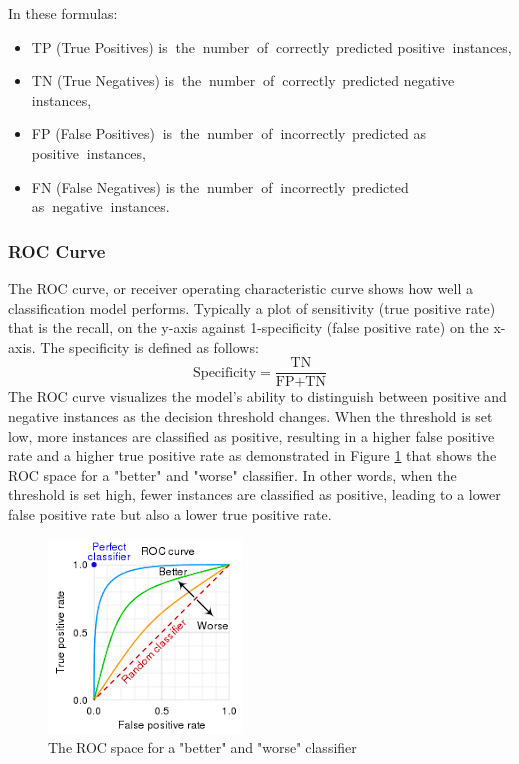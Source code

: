 In these formulas:
\begin{itemize}
    \item TP (True Positives) is\textcolor{white}{..}the\textcolor{white}{..}number\textcolor{white}{..}of\textcolor{white}{..}correctly\textcolor{white}{..}predicted positive\textcolor{white}{..}instances,
    \item TN (True Negatives) is\textcolor{white}{..}the\textcolor{white}{..}number\textcolor{white}{..}of\textcolor{white}{..}correctly\textcolor{white}{..}predicted negative instances,
    \item FP (False Positives)\textcolor{white}{..}is\textcolor{white}{..}the\textcolor{white}{..}number\textcolor{white}{..}of\textcolor{white}{..}incorrectly\textcolor{white}{..}predicted as positive\textcolor{white}{..}instances,
    \item FN (False Negatives) is the\textcolor{white}{..}number\textcolor{white}{..}of\textcolor{white}{..}incorrectly\textcolor{white}{..}predicted as\textcolor{white}{..}negative\textcolor{white}{..}instances.
\end{itemize}

\subsubsection{ROC Curve} 
The ROC curve, or receiver operating characteristic curve shows how well a classification model performs. Typically a plot of sensitivity (true positive rate) that is the recall, on the y-axis against 1-specificity (false positive rate) on the x-axis. The specificity is defined as follows:
 \begin{equation}
    \text{Specificity} = \frac{\text{TN}}{\text{FP} + \text{TN}}
    \end{equation}
The ROC curve visualizes the model's ability to distinguish between positive and negative instances as the decision threshold changes. When the threshold is set low, more instances are classified as positive, resulting in a higher false positive rate and a higher true positive rate as demonstrated in Figure \ref{fig:roc} that shows the ROC space for a "better" and "worse" classifier. In other words, when the threshold is set high, fewer instances are classified as positive, leading to a lower false positive rate but also a lower true positive rate. 

\begin{figure}[H]
    \centering
    \includegraphics[scale=1.1]{figures/roc.png}
    \captionsetup{font=large}
    \caption{The\textcolor{white}{.}ROC\textcolor{white}{.}space\textcolor{white}{.}for\textcolor{white}{.}a\textcolor{white}{.}"better"\textcolor{white}{.}and\textcolor{white}{.}"worse"\textcolor{white}{.}classifier}
    \label{fig:roc}
\end{figure}
